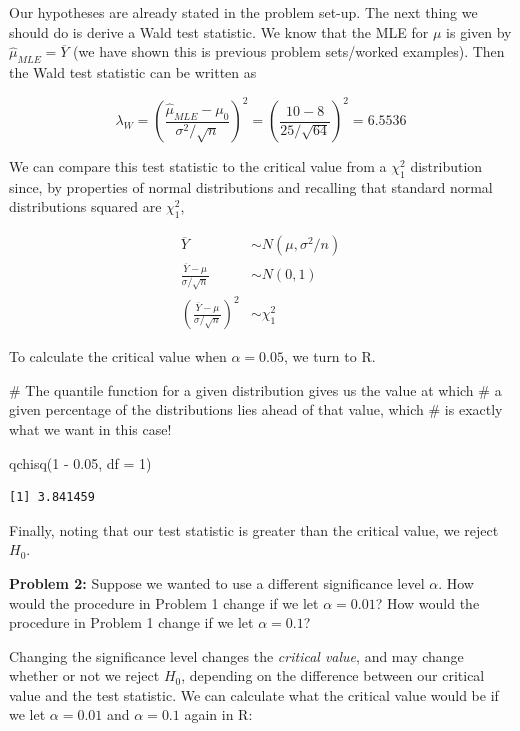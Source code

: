 \documentclass[
  letterpaper,
  DIV=11,
  numbers=noendperiod]{scrreprt}
\newenvironment{Shaded}{\begin{snugshade}}{\end{snugshade}}
\newcommand{\AttributeTok}[1]{\textcolor[rgb]{0.40,0.45,0.13}{#1}}
\newcommand{\CommentTok}[1]{\textcolor[rgb]{0.37,0.37,0.37}{#1}}
\newcommand{\DecValTok}[1]{\textcolor[rgb]{0.68,0.00,0.00}{#1}}
\newcommand{\FloatTok}[1]{\textcolor[rgb]{0.68,0.00,0.00}{#1}}
\newcommand{\FunctionTok}[1]{\textcolor[rgb]{0.28,0.35,0.67}{#1}}
\newcommand{\NormalTok}[1]{\textcolor[rgb]{0.00,0.23,0.31}{#1}}
\newcommand{\SpecialCharTok}[1]{\textcolor[rgb]{0.37,0.37,0.37}{#1}}
\begin{document}
Our hypotheses are already stated in the problem set-up. The next thing
we should do is derive a Wald test statistic. We know that the MLE for
\(\mu\) is given by \(\hat{\mu}_{MLE} = \overline{Y}\) (we have shown
this is previous problem sets/worked examples). Then the Wald test
statistic can be written as

\[
\lambda_W = \left( \frac{\hat{\mu}_{MLE} - \mu_0}{\sigma^2/\sqrt{n}}\right)^2 = \left( \frac{10 - 8}{25/\sqrt{64}}\right)^2 = 6.5536
\]

We can compare this test statistic to the critical value from a
\(\chi^2_1\) distribution since, by properties of normal distributions
and recalling that standard normal distributions squared are
\(\chi^2_1\),

\begin{align*}
    \overline{Y} & \sim N(\mu, \sigma^2/n) \\
    \frac{\overline{Y} - \mu}{\sigma/\sqrt{n}} & \sim N(0,1) \\
    \left( \frac{\overline{Y} - \mu}{\sigma/\sqrt{n}}  \right)^2 & \sim \chi^2_1 
\end{align*}

To calculate the critical value when \(\alpha = 0.05\), we turn to R.

\begin{Shaded}
\begin{Highlighting}[]
\CommentTok{\# The quantile function for a given distribution gives us the value at which}
\CommentTok{\# a given percentage of the distributions lies ahead of that value, which}
\CommentTok{\# is exactly what we want in this case!}

\FunctionTok{qchisq}\NormalTok{(}\DecValTok{1} \SpecialCharTok{{-}} \FloatTok{0.05}\NormalTok{, }\AttributeTok{df =} \DecValTok{1}\NormalTok{)}
\end{Highlighting}
\end{Shaded}

\begin{verbatim}
[1] 3.841459
\end{verbatim}

Finally, noting that our test statistic is greater than the critical
value, we reject \(H_0\).

\textbf{Problem 2:} Suppose we wanted to use a different significance
level \(\alpha\). How would the procedure in Problem 1 change if we let
\(\alpha = 0.01\)? How would the procedure in Problem 1 change if we let
\(\alpha = 0.1\)?

Changing the significance level changes the \emph{critical value}, and
may change whether or not we reject \(H_0\), depending on the difference
between our critical value and the test statistic. We can calculate what
the critical value would be if we let \(\alpha = 0.01\) and
\(\alpha = 0.1\) again in R:
\end{document}
